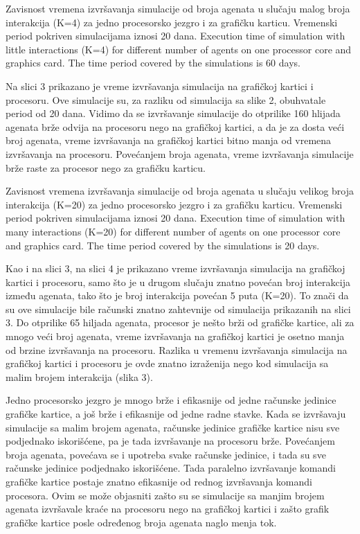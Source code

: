     {Zavisnost vremena izvršavanja simulacije od broja agenata u slučaju malog broja interakcija (K=4) za jedno procesorsko jezgro i za grafičku karticu. Vremenski period pokriven simulacijama iznosi 20 dana. }
    {Execution time of simulation with little interactions (K=4) for different number of agents on one processor core and graphics card. The time period covered by the simulations is 60 days.}

Na slici 3 prikazano je vreme izvršavanja simulacija na grafičkoj kartici i procesoru. Ove simulacije su, za razliku od simulacija sa slike 2, obuhvatale period od 20 dana. Vidimo da se izvršavanje simulacije do otprilike 160 hlijada agenata brže odvija na procesoru nego na grafičkoj kartici, a da je za dosta veći broj agenata, vreme izvršavanja na grafičkoj kartici bitno manja od vremena izvršavanja na procesoru. Povećanjem broja agenata, vreme izvršavanja simulacije brže raste za procesor nego za grafičku karticu.

    {Zavisnost vremena izvršavanja simulacije od broja agenata u slučaju velikog broja interakcija (K=20) za jedno procesorsko jezgro i za grafičku karticu. Vremenski period pokriven simulacijama iznosi 20 dana.}
    {Execution time of simulation with many interactions (K=20) for different number of agents on one processor core and graphics card. The time period covered by the simulations is 20 days.}

Kao i na slici 3, na slici 4 je prikazano vreme izvršavanja simulacija na grafičkoj kartici i procesoru, samo što je u drugom slučaju znatno povećan broj interakcija između agenata, tako što je broj interakcija povećan 5 puta (K=20). To znači da su ove simulacije bile računski znatno zahtevnije od simulacija prikazanih na slici 3. Do otprilike 65 hiljada agenata, procesor je nešto brži od grafičke kartice, ali za mnogo veći broj agenata, vreme izvršavanja na grafičkoj kartici je osetno manja od brzine izvršavanja na procesoru. Razlika u vremenu izvršavanja simulacija na grafičkoj kartici i procesoru je ovde znatno izraženija nego kod simulacija sa malim brojem interakcija (slika 3).

Jedno procesorsko jezgro je mnogo brže i efikasnije od jedne računske jedinice grafičke kartice, a još brže i efikasnije od jedne radne stavke. Kada se izvršavaju simulacije sa malim brojem agenata, računske jedinice grafičke kartice nisu sve podjednako iskorišćene, pa je tada izvršavanje na procesoru brže. Povećanjem broja agenata, povećava se i upotreba svake računske jedinice, i tada su sve računske jedinice podjednako iskorišćene. Tada paralelno izvršavanje komandi grafičke kartice postaje znatno efikasnije od rednog izvršavanja komandi procesora. Ovim se može objasniti zašto su se simulacije sa manjim brojem agenata izvršavale kraće na procesoru nego na grafičkoj kartici i zašto grafik grafičke kartice posle određenog broja agenata naglo menja tok.


